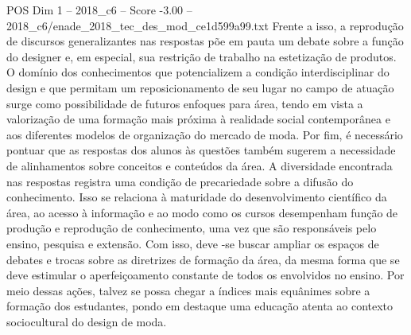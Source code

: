 \begin{textsample}{POS Dim 1 – 2018\_c6 – Score -3.00 – 2018\_c6/enade\_2018\_tec\_des\_mod\_ce1d599a99.txt}
Frente a isso, a reprodução de discursos generalizantes nas respostas põe em pauta um debate sobre a função do designer e, em especial, sua restrição de trabalho na estetização de produtos.
O domínio dos conhecimentos que potencializem a condição interdisciplinar do design e que permitam um reposicionamento de seu lugar no campo de atuação surge como possibilidade de futuros enfoques para área, tendo em vista a valorização de uma formação mais próxima à realidade social contemporânea e aos diferentes modelos de organização do mercado de moda.
Por fim, é necessário pontuar que as respostas dos alunos às questões também sugerem a necessidade de alinhamentos sobre conceitos e conteúdos da área.
A diversidade encontrada nas respostas registra uma condição de precariedade sobre a difusão do conhecimento.
Isso se relaciona à maturidade do desenvolvimento científico da área, ao acesso à informação e ao modo como os cursos desempenham função de produção e reprodução de conhecimento, uma vez que são responsáveis pelo ensino, pesquisa e extensão.
Com isso, deve -se buscar ampliar os espaços de debates e trocas sobre as diretrizes de formação da área, da mesma forma que se deve estimular o aperfeiçoamento constante de todos os envolvidos no ensino.
Por meio dessas ações, talvez se possa chegar a índices mais equânimes sobre a formação dos estudantes, pondo em destaque uma educação atenta ao contexto sociocultural do design de moda.

\end{textsample}
